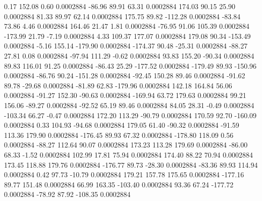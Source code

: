         0.17      152.08        0.60     0.0002884
      -86.96       89.91       63.31     0.0002884
      174.03       90.15       25.90     0.0002884
       81.33       89.97       62.14     0.0002884
      175.75       89.82     -112.28     0.0002884
      -83.84       73.86        4.46     0.0002884
      164.46       21.47        1.81     0.0002884
      -76.95       91.06      105.39     0.0002884
     -173.99       21.79       -7.19     0.0002884
        4.33      109.37      177.07     0.0002884
      179.08       90.34     -153.49     0.0002884
       -5.16      155.14     -179.90     0.0002884
     -174.37       90.48      -25.31     0.0002884
      -88.27       27.81        0.08     0.0002884
      -97.94      111.29       -0.62     0.0002884
       93.83      155.20      -90.34     0.0002884
       89.83      116.01       91.25     0.0002884
      -86.43       25.29     -177.52     0.0002884
     -179.49       89.93     -150.96     0.0002884
      -86.76       90.24     -151.28     0.0002884
      -92.45      150.28       89.46     0.0002884
      -91.62       89.78      -29.68     0.0002884
      -81.89       62.83     -179.96     0.0002884
      142.18      164.84       56.06     0.0002884
      -91.27      152.30      -90.63     0.0002884
     -169.94       63.72      179.63     0.0002884
       99.21      156.06      -89.27     0.0002884
      -92.52       65.19       89.46     0.0002884
       84.05       28.31       -0.49     0.0002884
     -103.34       66.27       -0.47     0.0002884
      172.20      113.29      -90.79     0.0002884
      170.59       92.70     -160.09     0.0002884
        0.33      104.93      -94.68     0.0002884
      179.05       61.40      -90.32     0.0002884
      -91.59      113.36      179.90     0.0002884
     -176.45       89.93       67.32     0.0002884
     -178.80      118.09        0.56     0.0002884
      -88.27      112.64       90.07     0.0002884
      173.23      113.28      179.69     0.0002884
      -86.00       68.33       -1.52     0.0002884
      102.99       17.81       75.94     0.0002884
      174.40       88.22       70.94     0.0002884
      173.45      118.88      179.76     0.0002884
     -176.77       89.73      -28.30     0.0002884
      -83.36       89.93      114.94     0.0002884
        0.42       97.73      -10.79     0.0002884
      179.21      157.78      175.65     0.0002884
     -177.16       89.77      151.48     0.0002884
       66.99      163.35     -103.40     0.0002884
       93.36       67.24     -177.72     0.0002884
      -78.92       87.92     -108.35     0.0002884
